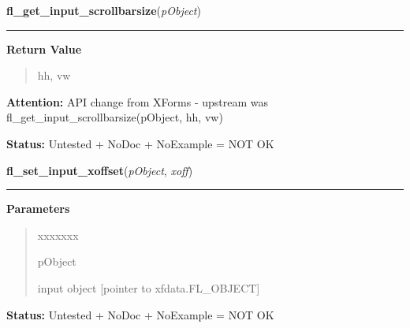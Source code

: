     \label{xformslib:library:fl_get_input_scrollbarsize}

    \vspace{0.5ex}

\hspace{.8\funcindent}\begin{boxedminipage}{\funcwidth}

    \raggedright \textbf{fl\_get\_input\_scrollbarsize}(\textit{pObject})

    \vspace{-1.5ex}

    \rule{\textwidth}{0.5\fboxrule}
\setlength{\parskip}{2ex}
\setlength{\parskip}{1ex}
      \textbf{Return Value}
    \vspace{-1ex}

      \begin{quote}
      hh, vw

      \end{quote}

\textbf{Attention:} API change from XForms - upstream was 
fl\_get\_input\_scrollbarsize(pObject, hh, vw)



\textbf{Status:} Untested + NoDoc + NoExample = NOT OK



    \end{boxedminipage}

    \label{xformslib:library:fl_set_input_xoffset}

    \vspace{0.5ex}

\hspace{.8\funcindent}\begin{boxedminipage}{\funcwidth}

    \raggedright \textbf{fl\_set\_input\_xoffset}(\textit{pObject}, \textit{xoff})

    \vspace{-1.5ex}

    \rule{\textwidth}{0.5\fboxrule}
\setlength{\parskip}{2ex}
\setlength{\parskip}{1ex}
      \textbf{Parameters}
      \vspace{-1ex}

      \begin{quote}
        \begin{Ventry}{xxxxxxx}

          \item[pObject]

          input object [pointer to xfdata.FL\_OBJECT]

        \end{Ventry}

      \end{quote}

\textbf{Status:} Untested + NoDoc + NoExample = NOT OK



    \end{boxedminipage}

